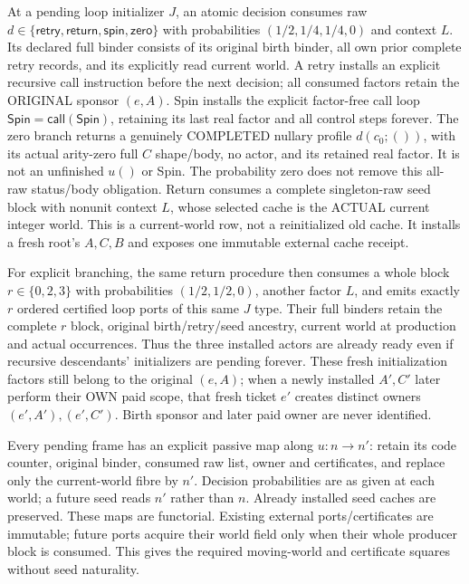 \documentclass[11pt]{article}\usepackage{amsmath,amssymb,amsthm}
\begin{document}
At a pending loop initializer $J$, an atomic decision consumes raw $d\in\{\mathsf{retry},\mathsf{return},\mathsf{spin},\mathsf{zero}\}$ with probabilities $(1/2,1/4,1/4,0)$ and context $L$. Its declared full binder consists of its original birth binder, all own prior complete retry records, and its explicitly read current world. A retry installs an explicit recursive call instruction before the next decision; all consumed factors retain the ORIGINAL sponsor $(e,A)$. Spin installs the explicit factor-free call loop $\mathsf{Spin}=\mathsf{call}(\mathsf{Spin})$, retaining its last real factor and all control steps forever. The zero branch returns a genuinely COMPLETED nullary profile $d(c_0;())$, with its actual arity-zero full $C$ shape/body, no actor, and its retained real factor. It is not an unfinished $u()$ or Spin. The probability zero does not remove this all-raw status/body obligation. Return consumes a complete singleton-raw seed block with nonunit context $L$, whose selected cache is the ACTUAL current integer world. This is a current-world row, not a reinitialized old cache. It installs a fresh root's $A,C,B$ and exposes one immutable external cache receipt.

For explicit branching, the same return procedure then consumes a whole block $r\in\{0,2,3\}$ with probabilities $(1/2,1/2,0)$, another factor $L$, and emits exactly $r$ ordered certified loop ports of this same $J$ type. Their full binders retain the complete $r$ block, original birth/retry/seed ancestry, current world at production and actual occurrences. Thus the three installed actors are already ready even if recursive descendants' initializers are pending forever. These fresh initialization factors still belong to the original $(e,A)$; when a newly installed $A',C'$ later perform their OWN paid scope, that fresh ticket $e'$ creates distinct owners $(e',A'),(e',C')$. Birth sponsor and later paid owner are never identified.

Every pending frame has an explicit passive map along $u:n\to n'$: retain its code counter, original binder, consumed raw list, owner and certificates, and replace only the current-world fibre by $n'$. Decision probabilities are as given at each world; a future seed reads $n'$ rather than $n$. Already installed seed caches are preserved. These maps are functorial. Existing external ports/certificates are immutable; future ports acquire their world field only when their whole producer block is consumed. This gives the required moving-world and certificate squares without seed naturality.
\end{document}
